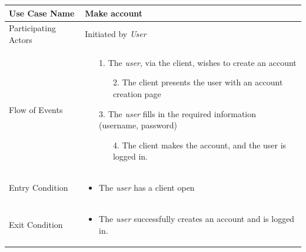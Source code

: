 \begin{center}
	\begin{tabular}{ | l | p{10cm} |  }
		 \hline
		Use Case Name & Make account \\ \hline
		Participating Actors & Initiated by \emph{User} \\ \hline
		Flow of Events & \begin{enumerate}
						\item[1.] The \emph{user}, via the client, wishes to create an account
						\begin{enumerate}
							\item[2.] The client presents the user with an account creation page
						\end{enumerate}
						\item[3.] The \emph{user} fills in the required information (username, password)
						\begin{enumerate}
							\item[4.] The client makes the account, and the user is logged in.
						\end{enumerate}
					\end{enumerate} \\ \hline
		Entry Condition & \begin{itemize}
						\item The \emph{user} has a client open
					\end{itemize} \\ \hline
		Exit Condition & \begin{itemize}
						\item The \emph{user} successfully creates an account and is logged in.
					\end{itemize} \\
		\hline
	\end{tabular}
\end{center}

